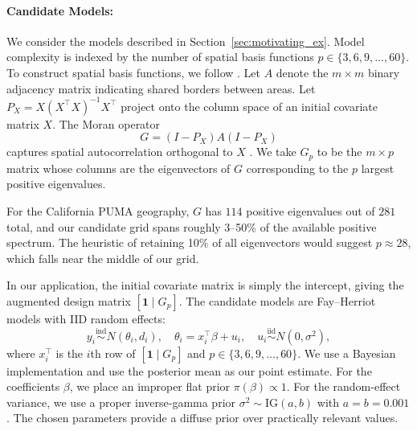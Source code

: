 \documentclass[11pt]{article}
\newcommand{\iid}{\stackrel{\text{iid}}{\sim}}
\newcommand{\ind}{\stackrel{\text{ind}}{\sim}}
\newcommand{\N}[2]{N\!\left(#1, #2\right)}
\theoremstyle{plain}
\theoremstyle{definition}
\theoremstyle{remark}
\begin{document}
\paragraph{Candidate Models:} We consider the models described in Section~\ref{sec:motivating_ex}. Model complexity is indexed by the number of spatial basis functions $p \in \{3, 6, 9, \ldots, 60\}$. To construct spatial basis functions, we follow \citet{hughes_dimension_2013}.
Let $A$ denote the $m \times m$ binary adjacency matrix indicating shared borders between areas.  Let $P_X = X(X^\top X)^{-1}X^\top$ project onto the column space of an initial covariate matrix $X$. The Moran operator
\[
G = (I - P_X) A (I - P_X)
\]
captures spatial autocorrelation orthogonal to $X$ \citep{moran_notes_1950, hughes_dimension_2013}.
We take $G_p$ to be the $m \times p$ matrix whose columns are the eigenvectors of $G$ corresponding to the $p$ largest positive eigenvalues.

For the California PUMA geography, $G$ has $114$ positive eigenvalues out of $281$ total, and our candidate grid spans roughly 3--50\% of the available positive spectrum. The \citet{hughes_dimension_2013} heuristic of retaining 10\% of all eigenvectors would suggest $p \approx 28$, which falls near the middle of our grid.

In our application, the initial covariate matrix is simply the intercept, giving the augmented design matrix $[\mathbf{1} \mid G_p]$. The candidate models are Fay--Herriot models with IID random effects:
\[
y_i \ind \N{\theta_i}{d_i}, \quad \theta_i = x_i^\top \beta + u_i, \quad u_i \iid N(0, \sigma^2),
\]
where $x_i^\top$ is the $i$th row of $[\mathbf{1} \mid G_p]$ and $p \in \{3, 6, 9, \ldots, 60\}$. We use a Bayesian implementation and use the posterior mean as our point estimate. For the coefficients $\beta$, we place an improper flat prior $\pi(\beta)\propto 1$. For the random-effect variance, we use a proper inverse-gamma prior $\sigma^2 \sim \mathrm{IG}(a,b)$ with $a=b=0.001$. The chosen parameters provide a diffuse prior over practically relevant values.
\end{document}
